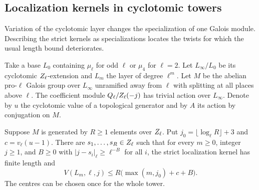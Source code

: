 \subsection{Localization kernels in cyclotomic towers}

Variation of the cyclotomic layer changes the specialization of one Galois module. Describing the strict kernels as specializations locates the twists for which the usual length bound deteriorates.

Take a base \(L_0\) containing \(\mu_\ell\) for odd \(\ell\) or
\(\mu_4\) for \(\ell=2\). Let \(L_\infty/L_0\) be its cyclotomic
\(Z_\ell\)-extension and \(L_m\) the layer of degree \(\ell^m\).
Let \(M\) be the abelian pro-\(\ell\) Galois group over \(L_\infty\)
unramified away from \(\ell\) with splitting at all places above \(\ell\).
The coefficient module \(Q_\ell/Z_\ell(-j)\) has trivial action
over \(L_\infty\). Denote by \(u\) the cyclotomic value of a topological
generator and by \(A\) its action by conjugation on \(M\).

\begin{lemma}\label{lem:tower-length-centres}
Suppose \(M\) is generated by \(R\ge1\) elements over \(Z_\ell\).
Put \(j_0=\lfloor\log_\ell R\rfloor+3\) and \(c=v_\ell(u-1)\).
There are \(s_1,\ldots,s_R\in Z_\ell\) such that for every \(m\ge0\),
integer \(j\ge1\), and \(B\ge0\) with
\(\lvert j-s_i\rvert_\ell\ge\ell^{-B}\) for all \(i\),
the strict localization kernel has finite length and
\begin{equation}\label{eq:tower-bound}
 V(L_m,\ell,j)\le R\big(\max(m,j_0)+c+B\big).
\end{equation}
The centres can be chosen once for the whole tower.
\end{lemma}

